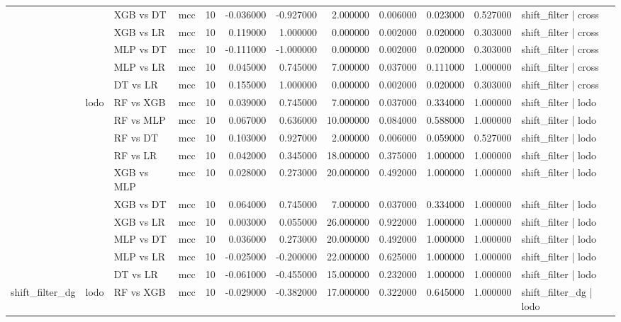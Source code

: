\begin{tabular}{llllrrrrrrrl}
 &  & XGB vs DT & mcc & 10 & -0.036000 & -0.927000 & 2.000000 & 0.006000 & 0.023000 & 0.527000 & shift_filter | cross \\
 &  & XGB vs LR & mcc & 10 & 0.119000 & 1.000000 & 0.000000 & 0.002000 & 0.020000 & 0.303000 & shift_filter | cross \\
 &  & MLP vs DT & mcc & 10 & -0.111000 & -1.000000 & 0.000000 & 0.002000 & 0.020000 & 0.303000 & shift_filter | cross \\
 &  & MLP vs LR & mcc & 10 & 0.045000 & 0.745000 & 7.000000 & 0.037000 & 0.111000 & 1.000000 & shift_filter | cross \\
 &  & DT vs LR & mcc & 10 & 0.155000 & 1.000000 & 0.000000 & 0.002000 & 0.020000 & 0.303000 & shift_filter | cross \\
\cline{2-12}
 & \multirow[t]{10}{*}{lodo} & RF vs XGB & mcc & 10 & 0.039000 & 0.745000 & 7.000000 & 0.037000 & 0.334000 & 1.000000 & shift_filter | lodo \\
 &  & RF vs MLP & mcc & 10 & 0.067000 & 0.636000 & 10.000000 & 0.084000 & 0.588000 & 1.000000 & shift_filter | lodo \\
 &  & RF vs DT & mcc & 10 & 0.103000 & 0.927000 & 2.000000 & 0.006000 & 0.059000 & 0.527000 & shift_filter | lodo \\
 &  & RF vs LR & mcc & 10 & 0.042000 & 0.345000 & 18.000000 & 0.375000 & 1.000000 & 1.000000 & shift_filter | lodo \\
 &  & XGB vs MLP & mcc & 10 & 0.028000 & 0.273000 & 20.000000 & 0.492000 & 1.000000 & 1.000000 & shift_filter | lodo \\
 &  & XGB vs DT & mcc & 10 & 0.064000 & 0.745000 & 7.000000 & 0.037000 & 0.334000 & 1.000000 & shift_filter | lodo \\
 &  & XGB vs LR & mcc & 10 & 0.003000 & 0.055000 & 26.000000 & 0.922000 & 1.000000 & 1.000000 & shift_filter | lodo \\
 &  & MLP vs DT & mcc & 10 & 0.036000 & 0.273000 & 20.000000 & 0.492000 & 1.000000 & 1.000000 & shift_filter | lodo \\
 &  & MLP vs LR & mcc & 10 & -0.025000 & -0.200000 & 22.000000 & 0.625000 & 1.000000 & 1.000000 & shift_filter | lodo \\
 &  & DT vs LR & mcc & 10 & -0.061000 & -0.455000 & 15.000000 & 0.232000 & 1.000000 & 1.000000 & shift_filter | lodo \\
\cline{1-12} \cline{2-12}
\multirow[t]{10}{*}{shift_filter_dg} & \multirow[t]{10}{*}{lodo} & RF vs XGB & mcc & 10 & -0.029000 & -0.382000 & 17.000000 & 0.322000 & 0.645000 & 1.000000 & shift_filter_dg | lodo \\

\end{tabular}
